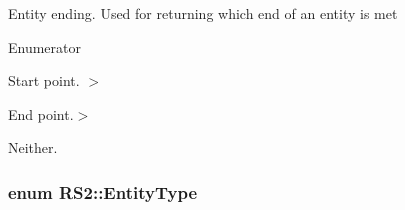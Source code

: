 Entity ending. Used for returning which end of an entity is met \begin{Desc}
\item[Enumerator]\par
\begin{description}
\item[{\em 
\hypertarget{class_r_s2_a30e80df2ef4bb36f4e89ea500eb212aba49f69cdcb5cc8c90b211d5f98631fe9d}{Ending\-Start}\label{class_r_s2_a30e80df2ef4bb36f4e89ea500eb212aba49f69cdcb5cc8c90b211d5f98631fe9d}
}]Start point. $>$ \item[{\em 
\hypertarget{class_r_s2_a30e80df2ef4bb36f4e89ea500eb212abaae7bf55673a9f4a36b86c1d1d975c8aa}{Ending\-End}\label{class_r_s2_a30e80df2ef4bb36f4e89ea500eb212abaae7bf55673a9f4a36b86c1d1d975c8aa}
}]End point.$>$ \item[{\em 
\hypertarget{class_r_s2_a30e80df2ef4bb36f4e89ea500eb212aba5ebf4600c052b2466c24af07d68bc900}{Ending\-None}\label{class_r_s2_a30e80df2ef4bb36f4e89ea500eb212aba5ebf4600c052b2466c24af07d68bc900}
}]Neither. \end{description}
\end{Desc}
\hypertarget{class_r_s2_a8f26d1b981e1e85cff16738b43337e6a}{
\subsubsection[{Entity\-Type}]{\setlength{\rightskip}{0pt plus 5cm}enum {\bf R\-S2\-::\-Entity\-Type}}}\label{class_r_s2_a8f26d1b981e1e85cff16738b43337e6a}
